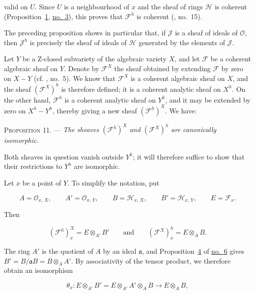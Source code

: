 valid on $U$. Since $U$ is a neighbourhood of $x$ and the sheaf of rings $\mathcal{H}$ is coherent (Proposition~\hyperref[gaga:prop:1]{1}, \hyperref[gaga:no:3]{no.~3}), this proves that $\mathcal{F}^h$ is coherent (, no.~15).

The preceding proposition shows in particular that, if $\mathcal{J}$ is a sheaf of ideals of $\mathcal{O}$, then $\mathcal{J}^h$ is precisely the sheaf of ideals of $\mathcal{H}$ generated by the elements of $\mathcal{J}$.


Let $Y$ be a Z-closed subvariety of the algebraic variety $X$, and let $\mathcal{F}$ be a coherent algebraic sheaf on $Y$. Denote by $\mathcal{F}^X$ the sheaf obtained by extending $\mathcal{F}$ by zero on $X-Y$ (cf. , no.~5). We know that $\mathcal{F}^X$ is a coherent algebraic sheaf on $X$, and the sheaf $(\mathcal{F}^X)^h$ is therefore defined; it is a coherent analytic sheaf on $X^h$. On the other hand, $\mathcal{F}^h$ is a coherent analytic sheaf on $Y^h$, and it may be extended by zero on $X^h-Y^h$, thereby giving a new sheaf $(\mathcal{F}^h)^X$. We have:

\textsc{Proposition 11}. --- \emph{The sheaves $(\mathcal{F}^h)^X$ and $(\mathcal{F}^X)^h$ are canonically isomorphic.}

Both sheaves in question vanish outside $Y^h$; it will therefore suffice to show that their restrictions to $Y^h$ are isomorphic.

Let $x$ be a point of $Y$. To simplify the notation, put

\begin{equation*}
A=\mathcal{O}_{x,\,X},\qquad A'=\mathcal{O}_{x,\,Y},\qquad
B=\mathcal{H}_{x,\,X},\qquad B'=\mathcal{H}_{x,\,Y},\qquad E=\mathcal{F}_x.
\end{equation*}

Then

\begin{equation*}
(\mathcal{F}^h)^X_x=E\otimes_{A'}B'
\qquad\text{and}\qquad
(\mathcal{F}^X)^h_x=E\otimes_AB.
\end{equation*}

The ring $A'$ is the quotient of $A$ by an ideal $\mathfrak{a}$, and Proposition~\hyperref[gaga:prop:4]{4} of \hyperref[gaga:no:6]{no.~6} gives $B'=B/\mathfrak{a}B=B\otimes_AA'$. By associativity of the tensor product, we therefore obtain an isomorphism

\begin{equation*}
\theta_x:E\otimes_{A'}B'=E\otimes_{A'}A'\otimes_AB\longrightarrow E\otimes_AB,
\end{equation*}

